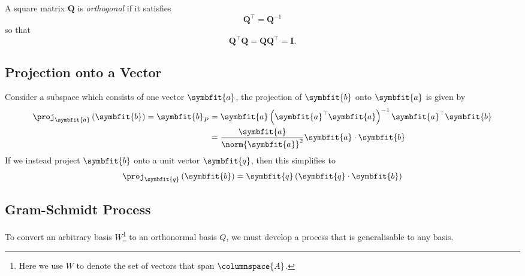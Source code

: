 \documentclass{article}
\begin{document}
\begin{definition}
    A square matrix \(\symbf{Q}\) is \textit{orthogonal} if it satisfies
    \begin{equation*}
        \symbf{Q}^\top = \symbf{Q}^{-1}
    \end{equation*}
    so that
    \begin{equation*}
        \symbf{Q}^\top \symbf{Q} = \symbf{Q}\symbf{Q}^\top = \symbf{I}.
    \end{equation*}
\end{definition}
\subsection{Projection onto a Vector}
Consider a subspace which consists of one vector \(\symbfit{a}\), the projection of \(\symbfit{b}\)
onto \(\symbfit{a}\) is given by
\begin{align*}
    \proj_{\symbfit{a}} \left( \symbfit{b} \right) = \symbfit{b}_P & = \symbfit{a} \left( \symbfit{a}^\top \symbfit{a} \right)^{-1} \symbfit{a}^\top \symbfit{b} \\
                                                                   & = \frac{\symbfit{a}}{\norm{\symbfit{a}}^2} \symbfit{a} \cdot \symbfit{b}
\end{align*}
If we instead project \(\symbfit{b}\) onto a unit vector \(\symbfit{q}\), then this simplifies to
\begin{equation*}
    \proj_{\symbfit{q}} \left( \symbfit{b} \right) = \symbfit{q} \left( \symbfit{q} \cdot \symbfit{b} \right)
\end{equation*}
\subsection{Gram-Schmidt Process}
To convert an arbitrary basis \(W\)\footnote{Here we use \(W\) to denote the set of vectors that span \(\columnspace{A}\).} to an orthonormal basis \(Q\), we
must develop a process that is generalisable to any basis.
\end{document}
